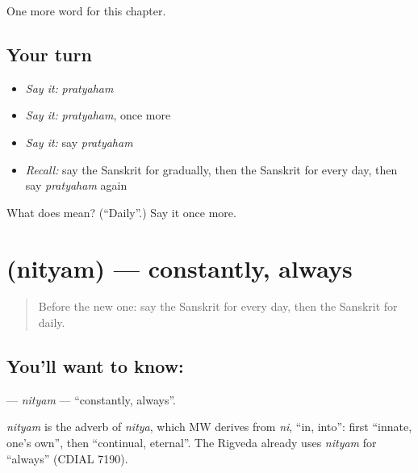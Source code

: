 \begin{grammarlens}[title={What you've built}]
One more word for this chapter.
\end{grammarlens}

\subsection*{Your turn}
\begin{itemize}
\raggedright
  \item \emph{Say it:} \emph{pratyaham}
  \item \emph{Say it:} \emph{pratyaham}, once more
  \item \emph{Say it:} say \emph{pratyaham}
  \item \emph{Recall:} say the Sanskrit for gradually, then the Sanskrit for every day, then say \emph{pratyaham} again
\end{itemize}

\begin{tcolorbox}[breakable,colback=teal!4,colframe=teal!35!black,title={Before you move on}]
What does  mean? (\textquotedblleft{}Daily\textquotedblright{}.) Say it once more.
\end{tcolorbox}
\section[\texorpdfstring{\sk{नित्यम्} (nityam)}{नित्यम् (nityam)}]{ (nityam) — constantly, always}

\label{lesson:SA-C240-nityam}



\begin{quote}
Before the new one: say the Sanskrit for every day, then the Sanskrit for daily.
\end{quote}

\subsection*{You'll want to know: }
\textbf{} — \emph{nityam} — \textquotedblleft{}constantly, always\textquotedblright{}.

\begin{cousinweb}
\emph{nityam} is the adverb of \emph{nitya}, which MW derives from \emph{ni}, \textquotedblleft{}in, into\textquotedblright{}: first \textquotedblleft{}innate, one's own\textquotedblright{}, then \textquotedblleft{}continual, eternal\textquotedblright{}. The Rigveda already uses \emph{nityam} for \textquotedblleft{}always\textquotedblright{} (CDIAL 7190).
\end{cousinweb}

